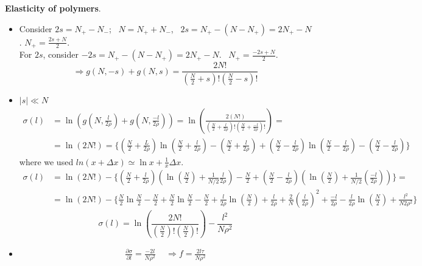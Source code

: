  \textbf{Elasticity of polymers}. \begin{itemize}
\item[(a)] Consider $2s = N_+ - N_-$; \, $N = N_+ + N_-$, \, $2s = N_+ - (N-N_+) = 2N_+ - N$.  \quad $N_+  = \frac{2s + N}{2}$.  \\
For $2s$, consider $-2s = N_+ - (N-N_+) = 2N_+ - N$.  \quad \, $N_+ = \frac{-2s + N}{2}$.  
\[
\Longrightarrow \boxed{ g(N,-s) + g(N,s) = \frac{2N!}{ \left( \frac{N}{2} + s \right)! \left( \frac{N}{2} - s \right)!} }
\]
\item[(b)] $|s| \ll N$
\[
\begin{aligned}
\sigma(l)  & =\ln{ \left( g\left( N, \frac{l}{2\rho } \right) + g\left( N, \frac{-l}{2\rho} \right) \right) }= \ln{ \left( \frac{ 2 (N!) }{ \left( \frac{N}{2} + \frac{l}{2\rho } \right)! \left( \frac{N}{2} + \frac{-l}{2\rho}\right)! } \right) } = \\
& = \ln{ (2N!) } = \lbrace \left( \frac{N}{2} + \frac{L}{2\rho } \right) \ln{ \left( \frac{N}{2} + \frac{l}{2\rho} \right) } - \left( \frac{N}{2} + \frac{l}{2\rho } \right) + \left( \frac{N}{2} - \frac{l}{2\rho} \right) \ln{ \left( \frac{N}{2} - \frac{l}{2\rho } \right) }  - \left( \frac{N}{2} - \frac{l}{2\rho} \right) \rbrace
\end{aligned}
\]
where we used $ln{ ( x + \Delta x )} \simeq \ln{x} + \frac{1}{x} \Delta x$.  
\[
 \begin{aligned} 
\sigma(l) & = \ln{( 2N!)} - \lbrace \left( \frac{N}{2} + \frac{l}{2\rho} \right) \left( \ln{\left( \frac{N}{2} \right) } + \frac{1}{N/2} \frac{l}{2\rho } \right) - \frac{N}{2} + \left( \frac{N}{2} - \frac{l}{2\rho} \right) \left( \ln{\left( \frac{N}{2} \right) } + \frac{1}{N/2} \left( \frac{ - l }{2\rho }\right) \right) \rbrace = \\
& = \ln{(2N!)} - \lbrace \frac{N}{2} \ln{\frac{N}{2}} - \frac{N}{2} + \frac{N}{2} \ln{\frac{N}{2}} - \frac{N}{2} + \frac{l}{2\rho} \ln{\left( \frac{N}{2} \right) } + \frac{l}{2\rho} + \frac{2}{N} \left( \frac{l}{2\rho} \right)^2 + \frac{ - l }{2\rho} - \frac{l}{2\rho } \ln{\left( \frac{N}{2} \right) } + \frac{l^2 }{ N 2\rho^2 } \rbrace 
\end{aligned}
\]
\[
\boxed{ \sigma(l)  = \ln{ \left( \frac{2N!}{ \left( \frac{N}{2} \right)! \left( \frac{N}{2} \right)!} \right) } - \frac{l^2 }{N \rho^2 } }
\]
\item[(c)] \[
\begin{gathered}
  \frac{\partial \sigma}{\partial l} = \frac{-2l}{N\rho^2} \quad \, \Longrightarrow \boxed{ f = \frac{2l\tau}{N \rho^2} }
\end{gathered}
\]
\end{itemize}







